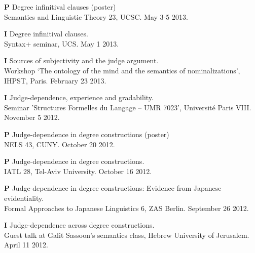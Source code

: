 \documentclass[12pt,letterpaper]{article}
\begin{document}
{\begin{hangparas}{.25in}{1}
\textbf{P} \hspace{1.2mm} Degree infinitival clauses (poster) \\Semantics and Linguistic Theory 23, UCSC. May 3-5 2013.

\vspace{1mm}

\textbf{I} \hspace{2mm} Degree infinitival clauses. \\Syntax+ seminar, UCS. May 1 2013.

\vspace{1mm}

\textbf{I} \hspace{2mm} Sources of subjectivity and the judge argument. \\ Workshop `The ontology of the mind and the semantics of nominalizations', IHPST, Paris. February 23 2013.

\vspace{1mm}

\textbf{I} \hspace{2mm} Judge-dependence, experience and gradability. \\Seminar 'Structures Formelles du Langage -- UMR 7023', Universit\'{e} Paris VIII. November 5 2012.

\vspace{1mm}

\textbf{P} \hspace{1.2mm} Judge-dependence in degree constructions (poster) \\ NELS 43, CUNY. October 20 2012.

\vspace{1mm}

\textbf{P} \hspace{1.2mm} Judge-dependence in degree constructions. \\ IATL 28, Tel-Aviv University. October 16 2012.

\vspace{1mm}

\textbf{P} \hspace{1mm} Judge-dependence in degree constructions: Evidence from Japanese evidentiality. \\Formal Approaches to Japanese Linguistics 6, ZAS Berlin. September 26 2012.

\vspace{1mm}

\textbf{I} \hspace{2mm} Judge-dependence across degree constructions. \\Guest talk at Galit Sassoon's semantics class, Hebrew University of Jerusalem. April 11 2012.


\end{hangparas}}
\end{document}
